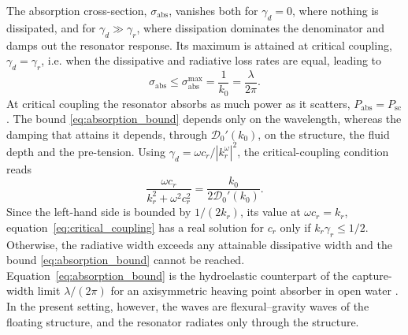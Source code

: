 \begin{remark} The absorption cross-section, $\sigma_{\mathrm{abs}}$, vanishes both for $\gamma_d=0$, where nothing is dissipated, and for $\gamma_d\gg\gamma_r$, where dissipation dominates the denominator and damps out the resonator response. Its maximum is attained at critical coupling, $\gamma_d=\gamma_r$, i.e. when the dissipative and radiative loss rates are equal, leading to
\begin{equation}
  \label{eq:absorption_bound}
  \sigma_{\mathrm{abs}}\le\sigma_{\mathrm{abs}}^{\max}=\frac{1}{k_0}=\frac{\lambda}{2\pi}.
\end{equation}
At critical coupling the resonator absorbs as much power as it scatters, $P_{\mathrm{abs}}=P_{\mathrm{sc}}$. The bound \eqref{eq:absorption_bound} depends only on the wavelength, whereas the damping that attains it depends, through $\mathcal{D}_0'(k_0)$, on the structure, the fluid depth and the pre-tension. Using $\gamma_d=\omega c_r/|k_r^\omega|^2$, the critical-coupling condition reads
\begin{equation}
  \label{eq:critical_coupling}
  \frac{\omega c_r}{k_r^2+\omega^2c_r^2}=\frac{k_0}{2\mathcal{D}_0'(k_0)} .
\end{equation}
Since the left-hand side is bounded by $1/(2k_r)$, its value at $\omega c_r=k_r$, equation~\eqref{eq:critical_coupling} has a real solution for $c_r$ only if $k_r\gamma_r\le1/2$. Otherwise, the radiative width exceeds any attainable dissipative width and the bound \eqref{eq:absorption_bound} cannot be reached. Equation~\eqref{eq:absorption_bound} is the hydroelastic counterpart of the capture-width limit $\lambda/(2\pi)$ for an axisymmetric heaving point absorber in open water \citep{budal1975resonant,evans1976theory}. In the present setting, however, the waves are flexural--gravity waves of the floating structure, and the resonator radiates only through the structure.
\end{remark}
